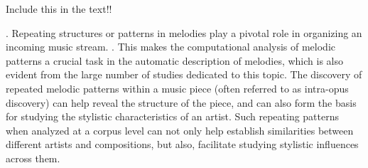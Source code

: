 Include this in the text!!
%

%
%

. Repeating structures or patterns in melodies play a pivotal role in organizing an incoming music stream. . This makes the computational analysis of melodic patterns a crucial task in the automatic description of melodies, which is also evident from the large number of studies dedicated to this topic. The discovery of repeated melodic patterns within a music piece (often referred to as intra-opus discovery) can help reveal the structure of the piece, and can also form the basis for studying the stylistic characteristics of an artist. Such repeating patterns when analyzed at a corpus level can not only help establish similarities between different artists and compositions, but also, facilitate studying stylistic influences across them. 

